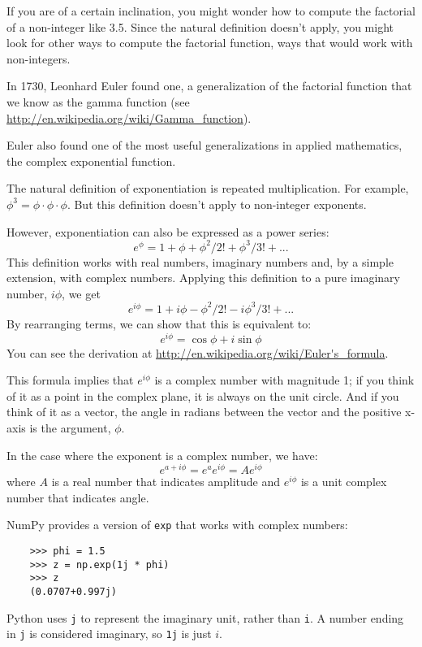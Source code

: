If you are of a certain inclination, you might wonder how to compute
the factorial of a non-integer like 3.5.  Since the natural definition
doesn't apply, you might look for other ways to compute the factorial
function, ways that would work with non-integers.

In 1730, Leonhard Euler found one, a generalization of the factorial
function that we know as the gamma function (see
\url{http://en.wikipedia.org/wiki/Gamma_function}).

Euler also found one of the most useful generalizations in applied
mathematics, the complex exponential function.

The natural definition of exponentiation is repeated multiplication.
For example, $\phi^3 = \phi \cdot \phi \cdot \phi$.  But this
definition doesn't apply to non-integer exponents.

However, exponentiation can also be expressed as a power series:
%
\[ e^\phi = 1 + \phi + \phi^2/2! + \phi^3/3! + ... \]
%
This definition works with real numbers, imaginary numbers and, by a simple
extension, with complex numbers.  Applying this definition
to a pure imaginary number, $i\phi$, we get
%
\[ e^{i\phi} = 1 + i\phi - \phi^2/2! - i\phi^3/3! + ... \]
%
By rearranging terms, we can show that this is equivalent to:
%
\[ e^{i\phi} = \cos \phi + i \sin \phi \]
%
You can see the derivation at
\url{http://en.wikipedia.org/wiki/Euler's_formula}.

This formula
implies that $e^{i\phi}$ is a complex number with magnitude 1; if you
think of it as a point in the complex plane, it is always on the unit
circle.  And if you think of it as a vector, the angle in radians
between the vector and the positive x-axis is the argument, $\phi$.

In the case where the exponent is a complex number, we have:
%
\[ e^{a + i\phi} = e^a e^{i\phi} = A e^{i\phi} \]
%
where $A$ is a real number that indicates amplitude and
$e^{i\phi}$ is a unit complex number that indicates angle.

NumPy provides a version of {\tt exp} that works with complex numbers:

\begin{verbatim}
	>>> phi = 1.5
	>>> z = np.exp(1j * phi)
	>>> z
	(0.0707+0.997j)
\end{verbatim}

Python uses {\tt j} to represent the imaginary unit, rather
than {\tt i}.  A number ending in {\tt j} is considered imaginary,
so {\tt 1j} is just $i$.

